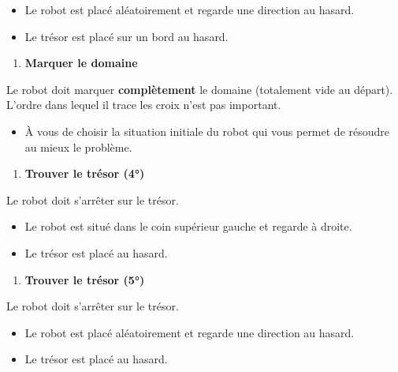 \liststyleListi
\begin{itemize}
\item {
Le robot est placé aléatoirement et regarde une direction au hasard.}
\item {
Le trésor est placé sur un bord au hasard.}
\end{itemize}
\liststyleExercice
\begin{enumerate}
\item {\sffamily\bfseries
Marquer le domaine}
\end{enumerate}
{
Le robot doit marquer \textbf{complètement} le domaine (totalement vide
au départ). L'ordre dans lequel il trace les croix
n'est pas important.}

\liststyleListi
\begin{itemize}
\item {
À vous de choisir la situation initiale du robot qui vous permet de
résoudre au mieux le problème.}
\end{itemize}
\liststyleExercice
\begin{enumerate}
\item {\sffamily\bfseries
Trouver le trésor (4°)}
\end{enumerate}
{
Le robot doit s'arrêter sur le trésor.}

\liststyleListi
\begin{itemize}
\item {
Le robot est situé dans le coin supérieur gauche et regarde à droite.}
\item {
Le trésor est placé au hasard.}
\end{itemize}
\liststyleExercice
\begin{enumerate}
\item {\sffamily\bfseries
Trouver le trésor (5°)}
\end{enumerate}
{
Le robot doit s'arrêter sur le trésor.}

\liststyleListi
\begin{itemize}
\item {
Le robot est placé aléatoirement et regarde une direction au hasard.}
\item {
Le trésor est placé au hasard.}
\end{itemize}

\bigskip


\bigskip


\bigskip
